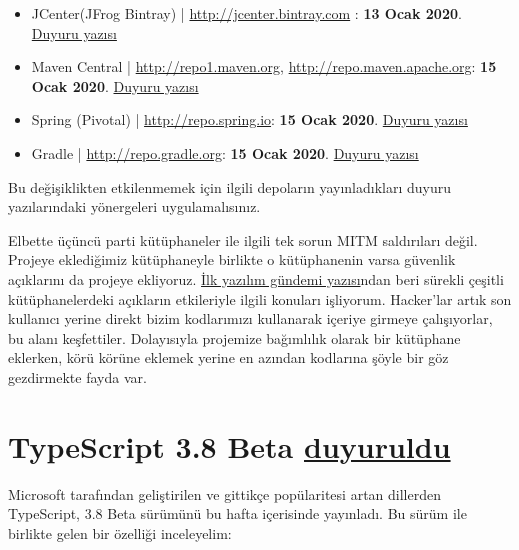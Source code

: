 \documentclass[11pt]{article}
\begin{document}
\begin{itemize}
\item JCenter(JFrog Bintray) | \url{http://jcenter.bintray.com} : \textbf{13 Ocak 2020}.
\href{https://jfrog.com/blog/secure-jcenter-with-https/}{Duyuru yazısı}
\item Maven Central | \url{http://repo1.maven.org}, \url{http://repo.maven.apache.org}: \textbf{15
Ocak 2020}. \href{https://central.sonatype.org/articles/2019/Apr/30/http-access-to-repo1mavenorg-and-repomavenapacheorg-is-being-deprecated/}{Duyuru yazısı}
\item Spring (Pivotal) | \url{http://repo.spring.io}: \textbf{15 Ocak 2020}. \href{https://spring.io/blog/2019/09/16/goodbye-http-repo-spring-use-https}{Duyuru yazısı}
\item Gradle | \url{http://repo.gradle.org}: \textbf{15 Ocak 2020}. \href{https://blog.gradle.org/decommissioning-http}{Duyuru yazısı}
\end{itemize}

Bu değişiklikten etkilenmemek için ilgili depoların yayınladıkları duyuru
yazılarındaki yönergeleri uygulamalısınız.

Elbette üçüncü parti kütüphaneler ile ilgili tek sorun MITM saldırıları değil.
Projeye eklediğimiz kütüphaneyle birlikte o kütüphanenin varsa güvenlik
açıklarını da projeye ekliyoruz. \href{../../2019/01/yazilim-gundemi-01.pdf}{İlk yazılım gündemi yazısı}ndan beri sürekli
çeşitli kütüphanelerdeki açıkların etkileriyle ilgili konuları işliyorum.
Hacker'lar artık son kullanıcı yerine direkt bizim kodlarımızı kullanarak
içeriye girmeye çalışıyorlar, bu alanı keşfettiler. Dolayısıyla projemize
bağımlılık olarak bir kütüphane eklerken, körü körüne eklemek yerine en azından
kodlarına şöyle bir göz gezdirmekte fayda var.
\section{TypeScript 3.8 Beta \href{https://devblogs.microsoft.com/typescript/announcing-typescript-3-8-beta}{duyuruldu}}
\label{sec:org8171fc7}
Microsoft tarafından geliştirilen ve gittikçe popülaritesi artan dillerden
TypeScript, 3.8 Beta sürümünü bu hafta içerisinde yayınladı. Bu sürüm ile
birlikte gelen bir özelliği inceleyelim:
\end{document}
